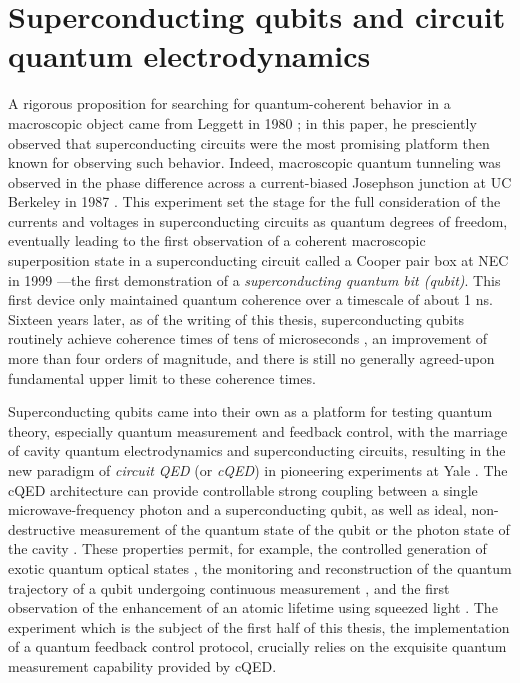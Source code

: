 \section{Superconducting qubits and circuit quantum electrodynamics}

A rigorous proposition for searching for quantum-coherent behavior in a macroscopic object came from Leggett in 1980 \cite{1980PThPS..69...80L}; in this paper, he presciently observed that superconducting circuits were the most promising platform then known for observing such behavior.  Indeed, macroscopic quantum tunneling was observed in the phase difference across a current-biased Josephson junction at UC Berkeley in 1987 \cite{PhysRevB.35.4682}.  This experiment set the stage for the full consideration of the currents and voltages in superconducting circuits as quantum degrees of freedom, eventually leading to the first observation of a coherent macroscopic superposition state in a superconducting circuit called a Cooper pair box at NEC in 1999 \cite{Nakamura1999}---the first demonstration of a \textit{superconducting quantum bit (qubit)}.  This first device only maintained quantum coherence over a timescale of about 1 ns.  Sixteen years later, as of the writing of this thesis, superconducting qubits routinely achieve coherence times of tens of microseconds \cite{Paik_3DT,Chang2013}, an improvement of more than four orders of magnitude, and there is still no generally agreed-upon fundamental upper limit to these coherence times.

Superconducting qubits came into their own as a platform for testing quantum theory, especially quantum measurement and feedback control, with the marriage of cavity quantum electrodynamics \cite{RevModPhys.73.565} and superconducting circuits, resulting in the new paradigm of \textit{circuit QED} (or \textit{cQED}) in pioneering experiments at Yale \cite{cQEDtheory,Wallraff2004}.  The cQED architecture can provide controllable strong coupling between a single microwave-frequency photon and a superconducting qubit, as well as ideal, non-destructive measurement of the quantum state of the qubit \cite{Vijay:2011kx,slichterthesis} or the photon state of the cavity \cite{Schuster2007}.  These properties permit, for example, the controlled generation of exotic quantum optical states \cite{Hofheinz2009,Vlastakis2013}, the monitoring and reconstruction of the quantum trajectory of a qubit undergoing continuous measurement \cite{murch_observing_2013,Weber2014,Weber2014a}, and the first observation of the enhancement of an atomic lifetime using squeezed light \cite{murch_reduction_2013}.  The experiment which is the subject of the first half of this thesis, the implementation of a quantum feedback control protocol, crucially relies on the exquisite quantum measurement capability provided by cQED.

